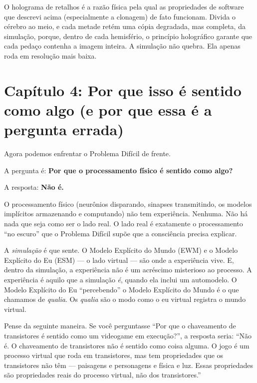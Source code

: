 \documentclass[11pt, twoside, openright]{book}
\begin{document}
O holograma de retalhos é a razão física pela qual as propriedades de software que descrevi acima (especialmente a clonagem) de fato funcionam. Divida o cérebro ao meio, e cada metade retém uma cópia degradada, mas completa, da simulação, porque, dentro de cada hemisfério, o princípio holográfico garante que cada pedaço contenha a imagem inteira. A simulação não quebra. Ela apenas roda em resolução mais baixa.


\chapter*{Capítulo 4: Por que isso é sentido como algo (e por que essa é a pergunta errada)}

Agora podemos enfrentar o Problema Difícil de frente.

A pergunta é: \textbf{Por que o processamento físico é sentido como algo?}

A resposta: \textbf{Não é.}

O processamento físico (neurônios disparando, sinapses transmitindo, os modelos implícitos armazenando e computando) não tem experiência. Nenhuma. Não há nada que seja como ser o lado real. O lado real é exatamente o processamento ``no escuro'' que o Problema Difícil supõe que a consciência precisa explicar.

A \textit{simulação} é que sente. O Modelo Explícito do Mundo (EWM) e o Modelo Explícito do Eu (ESM) --- o lado virtual --- são onde a experiência vive. E, dentro da simulação, a experiência não é um acréscimo misterioso ao processo. A experiência é aquilo que a simulação \textit{é}, quando ela inclui um automodelo. O Modelo Explícito do Eu ``percebendo'' o Modelo Explícito do Mundo é o que chamamos de \textit{qualia}. Os \textit{qualia} são o modo como o eu virtual registra o mundo virtual.

Pense da seguinte maneira. Se você perguntasse ``Por que o chaveamento de transistores é sentido como um videogame em execução?'', a resposta seria: ``Não é. O chaveamento de transistores não é sentido como coisa alguma. O jogo é um processo virtual que roda em transistores, mas tem propriedades que os transistores não têm --- paisagens e personagens e física e luz. Essas propriedades são propriedades reais do processo virtual, não dos transistores.''
\end{document}
